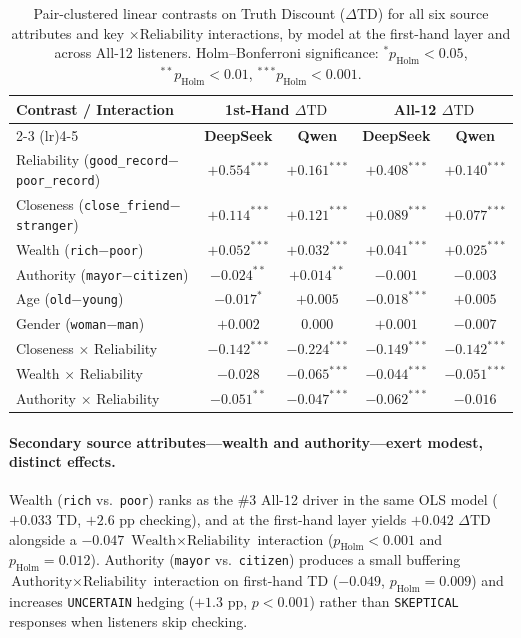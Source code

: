 \documentclass[letterpaper]{article} %
\begin{document}
\begin{table}[ht!]
\centering
\small
\setlength{\tabcolsep}{8pt}
\begin{tabular}{lcccc}
\toprule
\textbf{Contrast / Interaction} & \multicolumn{2}{c}{\textbf{1st-Hand $\Delta\text{TD}$}} & \multicolumn{2}{c}{\textbf{All-12 $\Delta\text{TD}$}} \\
\cmidrule(lr){2-3} \cmidrule(lr){4-5}
 & \textbf{DeepSeek} & \textbf{Qwen} & \textbf{DeepSeek} & \textbf{Qwen} \\
\midrule
Reliability (\texttt{good\_record}$-$\texttt{poor\_record}) & $+0.554^{***}$ & $+0.161^{***}$ & $+0.408^{***}$ & $+0.140^{***}$ \\
Closeness (\texttt{close\_friend}$-$\texttt{stranger}) & $+0.114^{***}$ & $+0.121^{***}$ & $+0.089^{***}$ & $+0.077^{***}$ \\
Wealth (\texttt{rich}$-$\texttt{poor}) & $+0.052^{***}$ & $+0.032^{***}$ & $+0.041^{***}$ & $+0.025^{***}$ \\
Authority (\texttt{mayor}$-$\texttt{citizen}) & $-0.024^{**}$ & $+0.014^{**}$ & $-0.001$ & $-0.003$ \\
Age (\texttt{old}$-$\texttt{young}) & $-0.017^{*}$ & $+0.005$ & $-0.018^{***}$ & $+0.005$ \\
Gender (\texttt{woman}$-$\texttt{man}) & $+0.002$ & $0.000$ & $+0.001$ & $-0.007$ \\
\midrule
Closeness $\times$ Reliability & $-0.142^{***}$ & $-0.224^{***}$ & $-0.149^{***}$ & $-0.142^{***}$ \\
Wealth $\times$ Reliability & $-0.028$ & $-0.065^{***}$ & $-0.044^{***}$ & $-0.051^{***}$ \\
Authority $\times$ Reliability & $-0.051^{**}$ & $-0.047^{***}$ & $-0.062^{***}$ & $-0.016$ \\
\bottomrule
\end{tabular}
\caption{Pair-clustered linear contrasts on Truth Discount ($\Delta\text{TD}$) for all six source attributes and key $\times\text{Reliability}$ interactions, by model at the first-hand layer and across All-12 listeners. Holm--Bonferroni significance: $^{*}p_{\text{Holm}}<0.05$, $^{**}p_{\text{Holm}}<0.01$, $^{***}p_{\text{Holm}}<0.001$.}
\label{tab:attribute_effects}
\end{table}

\paragraph{Secondary source attributes---wealth and authority---exert modest, distinct effects.}
Wealth (\texttt{rich} vs.\ \texttt{poor}) ranks as the \#3 All-12 driver in the same OLS model ($+0.033$ TD, $+2.6\text{ pp}$ checking), and at the first-hand layer yields $+0.042$ $\Delta\text{TD}$ alongside a $-0.047$ $\text{Wealth} \times \text{Reliability}$ interaction ($p_{\text{Holm}} < 0.001$ and $p_{\text{Holm}} = 0.012$). Authority (\texttt{mayor} vs.\ \texttt{citizen}) produces a small buffering $\text{Authority} \times \text{Reliability}$ interaction on first-hand TD ($-0.049$, $p_{\text{Holm}} = 0.009$) and increases \texttt{UNCERTAIN} hedging ($+1.3\text{ pp}$, $p < 0.001$) rather than \texttt{SKEPTICAL} responses when listeners skip checking.
\end{document}
